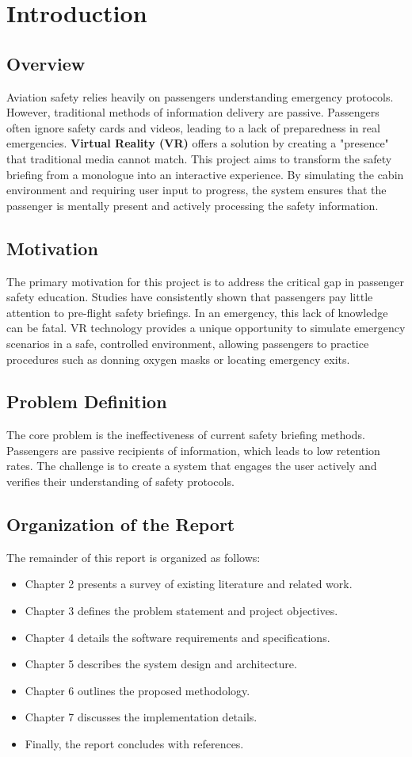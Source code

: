 \chapter{Introduction}

\section{Overview}
Aviation safety relies heavily on passengers understanding emergency protocols. However, traditional methods of information delivery are passive. Passengers often ignore safety cards and videos, leading to a lack of preparedness in real emergencies. \textbf{Virtual Reality (VR)} offers a solution by creating a "presence" that traditional media cannot match. This project aims to transform the safety briefing from a monologue into an interactive experience. By simulating the cabin environment and requiring user input to progress, the system ensures that the passenger is mentally present and actively processing the safety information.

\section{Motivation}
The primary motivation for this project is to address the critical gap in passenger safety education. Studies have consistently shown that passengers pay little attention to pre-flight safety briefings. In an emergency, this lack of knowledge can be fatal. VR technology provides a unique opportunity to simulate emergency scenarios in a safe, controlled environment, allowing passengers to practice procedures such as donning oxygen masks or locating emergency exits.

\section{Problem Definition}
The core problem is the ineffectiveness of current safety briefing methods. Passengers are passive recipients of information, which leads to low retention rates. The challenge is to create a system that engages the user actively and verifies their understanding of safety protocols.

\section{Organization of the Report}
The remainder of this report is organized as follows:
\begin{itemize}
    \item Chapter 2 presents a survey of existing literature and related work.
    \item Chapter 3 defines the problem statement and project objectives.
    \item Chapter 4 details the software requirements and specifications.
    \item Chapter 5 describes the system design and architecture.
    \item Chapter 6 outlines the proposed methodology.
    \item Chapter 7 discusses the implementation details.
    \item Finally, the report concludes with references.
\end{itemize}
